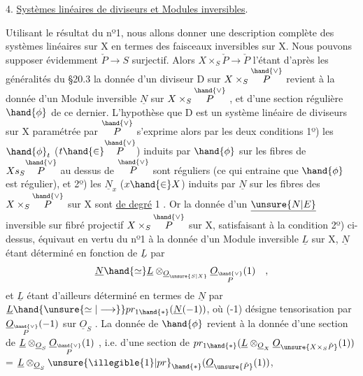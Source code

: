 
4. \uline{Systèmes linéaires de diviseurs et Modules inversibles}.

Utilisant le résultat du nº1, nous allons donner une description
complète des systèmes linéaires sur X en termes des faisceaux inversibles
sur X. Nous pouvons supposer évidemment $\check{P}\to S$ surjectif. Alors $X\times_S\check{P}\to \check{P}$ l'étant  d'après les généralités du \S 20.3 la donnée d'un
diviseur  D sur $X\times_S\overset{\hand{\vee}}{P}$  revient à la
donnée d'un Module inversible $\underline{N}$ sur $X\times_S\overset{\hand{\vee}}{P}$ , et d'une section régulière
$\hand{\phi}$ de ce dernier.  L'hypothèse que D est un système linéaire de
diviseurs sur X paramétrée par $\overset{\hand{\vee}}{P}$ s'exprime alors par les deux conditions
1º) les $\hand{\phi}_t$ ($t\hand{\in}\overset{\hand{\vee}}{P}$) induits par $\hand{\phi}$ sur les fibres de $Xs_S\overset{\hand{\vee}}{P}$ au dessus de $\overset{\hand{\vee}}{P}$
sont réguliers (ce qui entraine que $\hand{\phi}$ est régulier), et 2º) les $\underline{N}_x$ ($x\hand{\in} X$)
induits par $\underline{N}$  sur les fibres des $X\times_S\overset{\hand{\vee}}{P}$ sur X sont \uline{de degré} 1 .
Or la donnée d'un $\underline{\unsure{N|E}}$ inversible sur  fibré projectif $X\times_S\overset{\hand{\vee}}{P}$ sur X,
satisfaisant à la condition 2º) ci-dessus, équivaut en vertu du nº1
à la donnée d'un Module inversible $\underline{L}$ sur X, $\underline{N}$ étant déterminé en fonction
de $\underline{L}$ par
\[ \underline{N}\hand{\simeq}\underline{L}\otimes_{\underline{O}_{\unsure{S|X}}}\underline{O}_{\overset{\hand{\vee}}{P}}(1) \quad , \]
et $\underline{L}$ étant d'ailleurs déterminé en termes de $\underline{N}$ par $\underline{L}\hand{\unsure{\simeq|\longrightarrow}} pr_{1\hand{*}}(\underline{N}(-1))$,
où (-1) désigne  tensorisation par $\underline{O}_{\overset{\hand{\vee}}{P}}(-1)$ sur $\underline{O}_S$ . La donnée de $\hand{\phi}$
revient à la donnée d'une section de $\underline{L}\otimes_{\underline{O}_S}\underline{O}_{\overset{\hand{\vee}}{P}}(1)$ , i.e. d'une section
de $pr_{1\hand{*}}(\underline{L}\otimes_{\underline{O}_X}\underline{O}_{\unsure{X\times_S\check{P}}}(1))$ = $\underline{L}\otimes_{\underline{O}_S}\unsure{\illegible{1}|pr}_{\hand{*}}(\underline{O}_{\unsure{\check{P}}}(1))$, 
